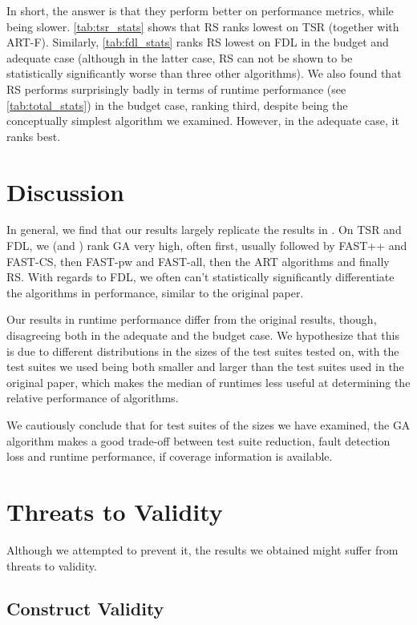 In short, the answer is that they perform better on performance metrics,
while being slower. \autoref{tab:tsr_stats} shows that RS ranks lowest
on TSR (together with ART-F). Similarly, \autoref{tab:fdl_stats} ranks
RS lowest on FDL in the budget and adequate case (although in the latter
case, RS can not be shown to be statistically significantly worse than
three other algorithms). We also found that RS performs surprisingly
badly in terms of runtime performance (see \autoref{tab:total_stats}) in
the budget case, ranking third, despite being the conceptually simplest
algorithm we examined. However, in the adequate case, it ranks best.

\section{Discussion}

In general, we find that our results largely replicate the
results in \cite{cruciani2019scalable}. On TSR and FDL, we (and
\cite{cruciani2019scalable}) rank GA very high, often first, usually
followed by FAST++ and FAST-CS, then FAST-pw and FAST-all, then the
ART algorithms and finally RS. With regards to FDL, we often can't
statistically significantly differentiate the algorithms in performance,
similar to the original paper.

Our results in runtime performance differ from the original results,
though, disagreeing both in the adequate and the budget case. We
hypothesize that this is due to different distributions in the sizes
of the test suites tested on, with the test suites we used being both
smaller and larger than the test suites used in the original paper, which
makes the median of runtimes less useful at determining the relative
performance of algorithms.

We cautiously conclude that for test suites of the sizes we have examined,
the GA algorithm makes a good trade-off between test suite reduction,
fault detection loss and runtime performance, if coverage information
is available.

\section{Threats to Validity}

Although we attempted to prevent it, the results we obtained might suffer
from threats to validity.

\subsection{Construct Validity}

